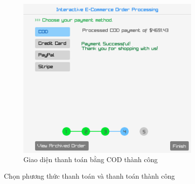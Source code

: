 \documentclass[a4paper,12pt]{report}
\begin{document}
\begin{figure}[!ht]
\begin{subfigure}{0.55\textwidth}
    \centering
    \includegraphics[width=\textwidth]{../assets/screenshots/gui/payment_cod_success.png}
    \caption{Giao diện thanh toán bằng COD thành công}
  \end{subfigure}
  \caption{Chọn phương thức thanh toán và thanh toán thành công}
\end{figure}
\end{document}
